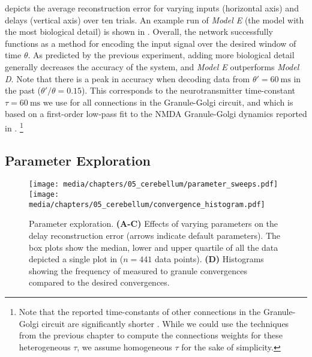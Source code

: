  depicts the average reconstruction error for varying inputs (horizontal axis) and delays (vertical axis) over ten trials.
An example run of \emph{Model E} (the model with the most biological detail) is shown in .
Overall, the network successfully functions as a method for encoding the input signal over the desired window of time $\theta$.
As predicted by the previous experiment, adding more biological detail generally decreases the accuracy of the system, and \emph{Model E} outperforms \emph{Model D}.
Note that there is a peak in accuracy when decoding data from $\theta' = \SI{60}{\milli\second}$ in the past ($\theta'/\theta=0.15$).
This corresponds to the neurotransmitter time-constant $\tau = \SI{60}{\milli\second}$ we use for all connections in the Granule-Golgi circuit, and which is based on a first-order low-pass fit to the NMDA Granule-Golgi dynamics reported in \citet{dieudonne1998submillisecond}.%
\footnote{Note that the reported time-constants of other connections in the Granule-Golgi circuit are significantly shorter \citep{kanichay2008synaptic}.
While we could use the techniques from the previous chapter to compute the connections weights for these heterogeneous $\tau$, we assume homogeneous $\tau$ for the sake of simplicity.}

\clearpage

\subsection{Parameter Exploration}
\label{sec:cerebellum_vary_parameters}

\begin{figure}[t]%
	\centering
	\texttt{[image: media/chapters/05\_cerebellum/parameter\_sweeps.pdf]}%
	\texttt{[image: media/chapters/05\_cerebellum/convergence\_histogram.pdf]}%
	{\label{fig:cerebellum_param_sweeps_a}}%
	{\label{fig:cerebellum_param_sweeps_b}}%
	{\label{fig:cerebellum_param_sweeps_c}}%
	{\label{fig:cerebellum_param_sweeps_d}}%
	\caption[Cerebellum model parameter exploration.]{Parameter exploration. \textbf{(A-C)} Effects of varying parameters on the delay reconstruction error (arrows indicate default parameters). The box plots show the median, lower and upper quartile of all the data depicted a single plot in  ($n = 441$ data points). \textbf{(D)} Histograms showing the frequency of measured \PCN to granule convergences compared to the desired convergences.}
	\label{fig:cerebellum_param_sweeps}
\end{figure}

